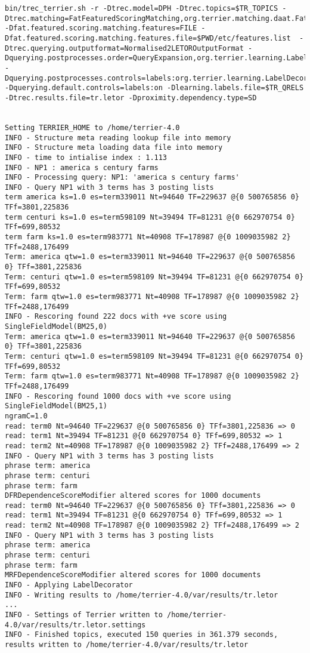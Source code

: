 \begin{verbatim}
bin/trec_terrier.sh -r -Dtrec.model=DPH -Dtrec.topics=$TR_TOPICS -Dtrec.matching=FatFeaturedScoringMatching,org.terrier.matching.daat.FatFull -Dfat.featured.scoring.matching.features=FILE -Dfat.featured.scoring.matching.features.file=$PWD/etc/features.list  -Dtrec.querying.outputformat=Normalised2LETOROutputFormat -Dquerying.postprocesses.order=QueryExpansion,org.terrier.learning.LabelDecorator -Dquerying.postprocesses.controls=labels:org.terrier.learning.LabelDecorator,qe:QueryExpansion -Dquerying.default.controls=labels:on -Dlearning.labels.file=$TR_QRELS -Dtrec.results.file=tr.letor -Dproximity.dependency.type=SD


Setting TERRIER_HOME to /home/terrier-4.0
INFO - Structure meta reading lookup file into memory
INFO - Structure meta loading data file into memory
INFO - time to intialise index : 1.113
INFO - NP1 : america s century farms
INFO - Processing query: NP1: 'america s century farms'
INFO - Query NP1 with 3 terms has 3 posting lists
term america ks=1.0 es=term339011 Nt=94640 TF=229637 @{0 500765856 0} TFf=3801,225836
term centuri ks=1.0 es=term598109 Nt=39494 TF=81231 @{0 662970754 0} TFf=699,80532
term farm ks=1.0 es=term983771 Nt=40908 TF=178987 @{0 1009035982 2} TFf=2488,176499
Term: america qtw=1.0 es=term339011 Nt=94640 TF=229637 @{0 500765856 0} TFf=3801,225836
Term: centuri qtw=1.0 es=term598109 Nt=39494 TF=81231 @{0 662970754 0} TFf=699,80532
Term: farm qtw=1.0 es=term983771 Nt=40908 TF=178987 @{0 1009035982 2} TFf=2488,176499
INFO - Rescoring found 222 docs with +ve score using SingleFieldModel(BM25,0)
Term: america qtw=1.0 es=term339011 Nt=94640 TF=229637 @{0 500765856 0} TFf=3801,225836
Term: centuri qtw=1.0 es=term598109 Nt=39494 TF=81231 @{0 662970754 0} TFf=699,80532
Term: farm qtw=1.0 es=term983771 Nt=40908 TF=178987 @{0 1009035982 2} TFf=2488,176499
INFO - Rescoring found 1000 docs with +ve score using SingleFieldModel(BM25,1)
ngramC=1.0
read: term0 Nt=94640 TF=229637 @{0 500765856 0} TFf=3801,225836 => 0
read: term1 Nt=39494 TF=81231 @{0 662970754 0} TFf=699,80532 => 1
read: term2 Nt=40908 TF=178987 @{0 1009035982 2} TFf=2488,176499 => 2
INFO - Query NP1 with 3 terms has 3 posting lists
phrase term: america
phrase term: centuri
phrase term: farm
DFRDependenceScoreModifier altered scores for 1000 documents
read: term0 Nt=94640 TF=229637 @{0 500765856 0} TFf=3801,225836 => 0
read: term1 Nt=39494 TF=81231 @{0 662970754 0} TFf=699,80532 => 1
read: term2 Nt=40908 TF=178987 @{0 1009035982 2} TFf=2488,176499 => 2
INFO - Query NP1 with 3 terms has 3 posting lists
phrase term: america
phrase term: centuri
phrase term: farm
MRFDependenceScoreModifier altered scores for 1000 documents
INFO - Applying LabelDecorator
INFO - Writing results to /home/terrier-4.0/var/results/tr.letor
...
INFO - Settings of Terrier written to /home/terrier-4.0/var/results/tr.letor.settings
INFO - Finished topics, executed 150 queries in 361.379 seconds, results written to /home/terrier-4.0/var/results/tr.letor
\end{verbatim}

